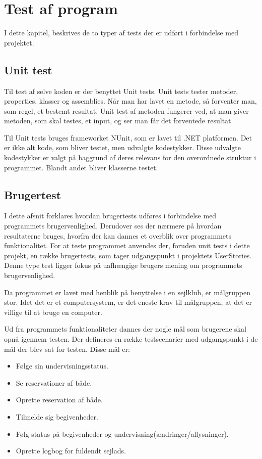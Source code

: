 \chapter{Test af program}\label{test_af_program}
I dette kapitel, beskrives de to typer af tests der er udført i forbindelse med projektet.

\section{Unit test}
Til test af selve koden er der benyttet Unit tests.
Unit tests tester metoder, properties, klasser og assemblies. 
Når man har lavet en metode, så forventer man, som regel, et bestemt resultat.
Unit test af metoden fungerer ved, at man giver metoden, som skal testes, et input, og ser man får det forventede resultat.

Til Unit tests bruges frameworket NUnit, som er lavet til .NET platformen. 
Det er ikke alt kode, som bliver testet, men udvalgte kodestykker.
Disse udvalgte kodestykker er valgt på baggrund af deres relevans for den overordnede struktur i programmet. 
Blandt andet bliver klasserne testet.

\section{Brugertest}
I dette afsnit forklares hvordan brugertests udføres i forbindelse med programmets brugervenlighed.
Derudover ses der nærmere på hvordan resultaterne bruges, hvorfra der kan dannes et overblik over programmets funktionalitet. 
For at teste programmet anvendes der, foruden unit tests i dette projekt, en række brugertests, som tager udgangspunkt i projektets UserStories.
Denne type test ligger fokus på uafhængige brugers mening om programmets brugervenlighed.

Da programmet er lavet med henblik på benyttelse i en sejlklub, er målgruppen stor. 
Idet det er et computersystem, er det eneste krav til målgruppen, at det er villige til at bruge en computer.

Ud fra programmets funktionaliteter dannes der nogle mål som brugerene skal opnå igennem testen. 
Der defineres en række testscenarier med udgangspunkt i de mål der blev sat for testen.
Disse mål er:
\begin{itemize}
  \item Følge sin undervisningsstatus.
  \item Se reservationer af både.
  \item Oprette reservation af både.
  \item Tilmelde sig begivenheder.
  \item Følg status på begivenheder og undervisning(ændringer/aflysninger).
  \item Oprette logbog for fuldendt sejlads.
\end{itemize}

